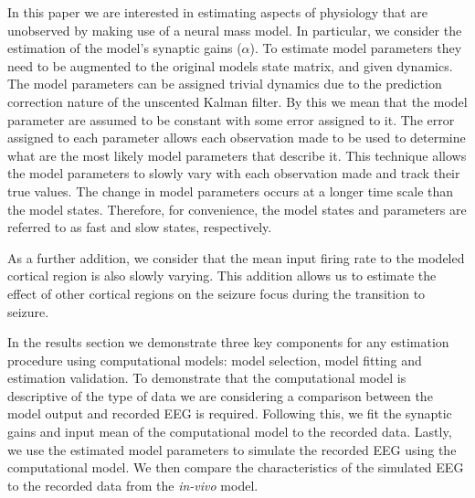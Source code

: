 
In this paper we are interested in estimating aspects of physiology that are unobserved by making use of a neural mass model. In particular, we consider the estimation of the model's synaptic gains ($\alpha$). To estimate model parameters they need to be augmented to the original models state matrix, and given dynamics. The model parameters can be assigned trivial dynamics due to the prediction correction nature of the unscented Kalman filter. By this we mean that the model parameter are assumed to be constant with some error assigned to it. The error assigned to each parameter allows each observation made to be used to determine what are the most likely model parameters that describe it. This technique allows the model parameters to slowly vary with each observation made and track their true values. The change in model parameters occurs at a longer time scale than the model states. Therefore, for convenience, the model states and parameters are referred to as fast and slow states, respectively. 

As a further addition, we consider that the mean input firing rate to the modeled cortical region is also slowly varying. This addition allows us to estimate the effect of other cortical regions on the seizure focus during the transition to seizure.

In the results section we demonstrate three key components for any estimation procedure using computational models: model selection, model fitting and estimation validation. To demonstrate that the computational model is descriptive of the type of data we are considering a comparison between the model output and recorded EEG is required. Following this, we fit the synaptic gains and input mean of the computational model to the recorded data. Lastly, we use the estimated model parameters to simulate the recorded EEG using the computational model. We then compare the characteristics of the simulated EEG to the recorded data from the \textsl{in-vivo} model.
